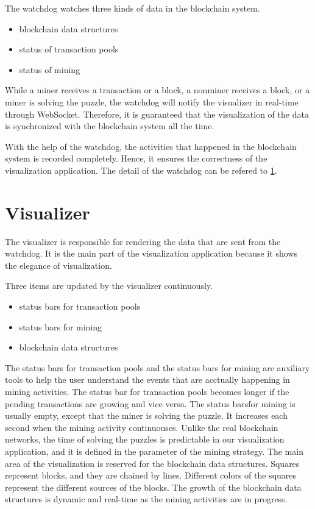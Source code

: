 The watchdog watches three kinds of data in the blockchain system.

\begin{itemize}
    \item blockchain data structures
    \item status of transaction pools
    \item status of mining
\end{itemize}

While a miner receives a transaction or a block, a nonminer receives a block, or a miner is solving the puzzle, the watchdog will notify the visualizer in real-time through WebSocket. Therefore, it is guaranteed that the visualization of the data is synchronized with the blockchain system all the time.

With the help of the watchdog, the activities that happened in the blockchain system is recorded completely. Hence, it ensures the correctness of the visualization application. The detail of the watchdog can be refered to \ref{}.

\section{Visualizer}

The visualizer is responsible for rendering the data that are sent from the watchdog. It is the main part of the visualization application because it shows the elegance of visualization. 

Three items are updated by the visualizer continuously.

\begin{itemize}
    \item status bars for transaction pools
    \item status bars for mining
    \item blockchain data structures
\end{itemize}

The status bars for transaction pools and the status bars for mining are auxiliary tools to help the user understand the events that are acctually happening in mining activities. The status bar for transaction pools becomes longer if the pending transactions are growing and vice versa. The status barsfor mining is usually empty, except that the miner is solving the puzzle. It increases each second when the mining activity continuouses. Unlike the real blockchain networks, the time of solving the puzzles is predictable in our visualization application, and it is defined in the parameter of the mining strategy. The main area of the visualization is reserved for the blockchain data structures. Squares represent blocks, and they are chained by lines. Different colors of the squares represent the different sources of the blocks. The growth of the blockchain data structures is dynamic and real-time as the mining activities are in progress.

